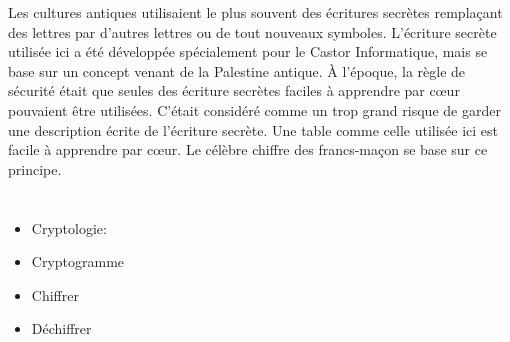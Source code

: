 {{Les cultures antiques utilisaient le plus souvent des écritures secrètes remplaçant des lettres par d’autres lettres ou de tout nouveaux symboles. L’écriture secrète utilisée ici a été développée spécialement pour le Castor Informatique, mais se base sur un concept venant de la Palestine antique. À l’époque, la règle de sécurité était que seules des écriture secrètes faciles à apprendre par cœur pouvaient être utilisées. C’était considéré comme un trop grand risque de garder une description écrite de l’écriture secrète. Une table comme celle utilisée ici est facile à apprendre par cœur. Le célèbre chiffre des francs-maçon se base sur ce principe.



\section*{\BrochureWebsitesAndKeywords}
{\raggedright
\begin{itemize}
  \item Cryptologie: \href{https://fr.wikipedia.org/wiki/Cryptologie}{}
  \item Cryptogramme
  \item Chiffrer
  \item Déchiffrer
\end{itemize}


}

}{}

\def\AuthorHromkovicJ{} %
\def\AuthorLacherR{} %
\def\AuthorDatzkoS{} %
\def\AuthorIkramovA{} %
\def\AuthorShahV{} %
\def\AuthorDagieneV{} %
\def\AuthorJungU{} %
\def\AuthorMoonK{} %
\def\AuthorPelletE{} %

\newpage}{}
